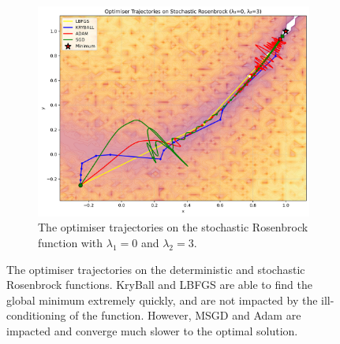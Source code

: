 \begin{figure}[!t]
    \vspace{1em}

    \begin{subfigure}[b]{0.49\linewidth}
        \centering
        \includegraphics[width=\linewidth]{figures/5evals/stochastic_0_3.png}
        \caption{The optimiser trajectories on the stochastic Rosenbrock function with $\lambda_1 = 0$ and $\lambda_2 = 3$.}
        \label{fig:stochastic_2}
    \end{subfigure}
    \caption{The optimiser trajectories on the deterministic and stochastic Rosenbrock functions. KryBall and LBFGS are able to find the global minimum extremely quickly, and are not impacted by the ill-conditioning of the function. However, MSGD and Adam are impacted and converge much slower to the optimal solution.}
    \label{fig:rosenbrock_results}
\end{figure}

